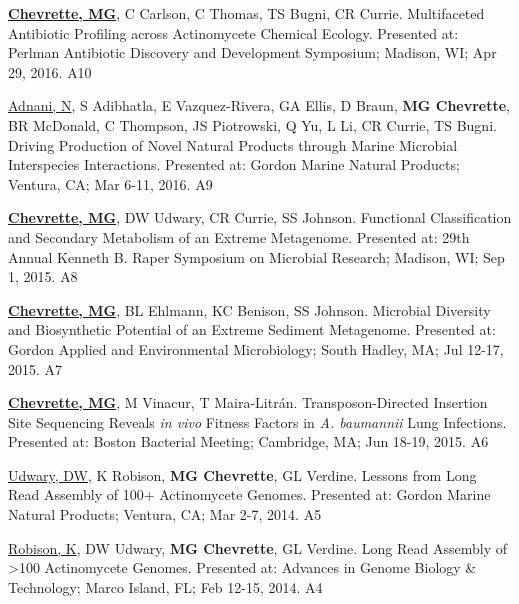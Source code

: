 \begin{cvpubs}
  \cvpub
    {\textbf{\underline{Chevrette, MG}}, C Carlson, C Thomas, TS Bugni, CR Currie.  Multifaceted Antibiotic Profiling across Actinomycete Chemical Ecology.  Presented at: Perlman Antibiotic Discovery and Development Symposium; Madison, WI; Apr 29, 2016.} %
    {A10} %

  \cvpub
    {\underline{Adnani, N}, S Adibhatla, E Vazquez-Rivera, GA Ellis, D Braun, \textbf{MG Chevrette}, BR McDonald, C Thompson, JS Piotrowski, Q Yu, L Li, CR Currie, TS Bugni.  Driving Production of Novel Natural Products through Marine Microbial Interspecies Interactions.  Presented at: Gordon Marine Natural Products; Ventura, CA; Mar 6-11, 2016.} %
    {A9} %
    
  \cvpub
    {\textbf{\underline{Chevrette, MG}}, DW Udwary, CR Currie, SS Johnson.  Functional Classification and Secondary Metabolism of an Extreme Metagenome.  Presented at: 29th Annual Kenneth B. Raper Symposium on Microbial Research; Madison, WI; Sep 1, 2015.} %
    {A8} %
    
  \cvpub
    {\textbf{\underline{Chevrette, MG}}, BL Ehlmann, KC Benison, SS Johnson.  Microbial Diversity and Biosynthetic Potential of an Extreme Sediment Metagenome.  Presented at: Gordon Applied and Environmental Microbiology; South Hadley, MA; Jul 12-17, 2015.} %
    {A7} %
    
  \cvpub
    {\textbf{\underline{Chevrette, MG}}, M Vinacur, T Maira-Litr\'{a}n.  Transposon-Directed Insertion Site Sequencing Reveals \textit{in vivo} Fitness Factors in \textit{A. baumannii} Lung Infections.  Presented at: Boston Bacterial Meeting; Cambridge, MA; Jun 18-19, 2015.} %
    {A6} %
    
  \cvpub
    {\underline{Udwary, DW}, K Robison, \textbf{MG Chevrette}, GL Verdine.  Lessons from Long Read Assembly of 100+ Actinomycete Genomes.  Presented at: Gordon Marine Natural Products; Ventura, CA; Mar 2-7, 2014.} %
    {A5} %
    
  \cvpub
    {\underline{Robison, K}, DW Udwary, \textbf{MG Chevrette}, GL Verdine.  Long Read Assembly of >100 Actinomycete Genomes.  Presented at: Advances in Genome Biology \& Technology; Marco Island, FL; Feb 12-15, 2014.} %
    {A4} %


\end{cvpubs}
